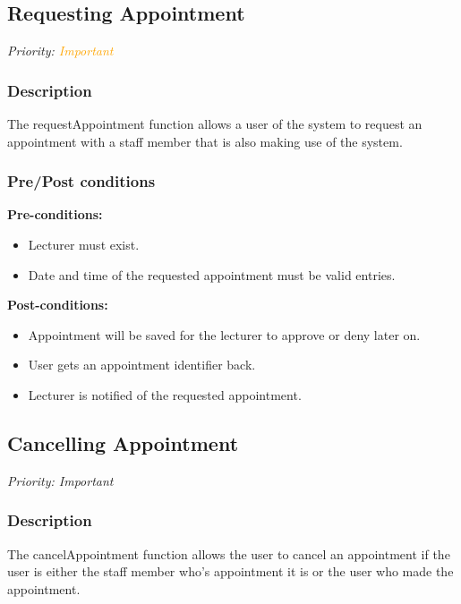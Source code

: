 \subsection{Requesting Appointment}
\textit{Priority: \textcolor{orange}{Important}} \\

\subsubsection{ Description}
The requestAppointment function allows a user of the system to request an appointment with a staff member that is also making use of the system. \\

\subsubsection{Pre/Post conditions}
\textbf{Pre-conditions:} 
	\begin{itemize}
		\item Lecturer must exist.
		\item Date and time of the requested appointment must be valid entries.
	\end{itemize}
\textbf{Post-conditions:} 
	\begin{itemize}
		\item Appointment will be saved for the lecturer to approve or deny later on.
		\item User gets an appointment identifier back.
		\item Lecturer is notified of the requested appointment. 
	\end{itemize}



\subsection{Cancelling Appointment}
\textit{Priority: Important} \\

\subsubsection{Description}
The cancelAppointment function allows the user to cancel an appointment if the user is either the staff member who's appointment it is or the user who made the appointment. \\

